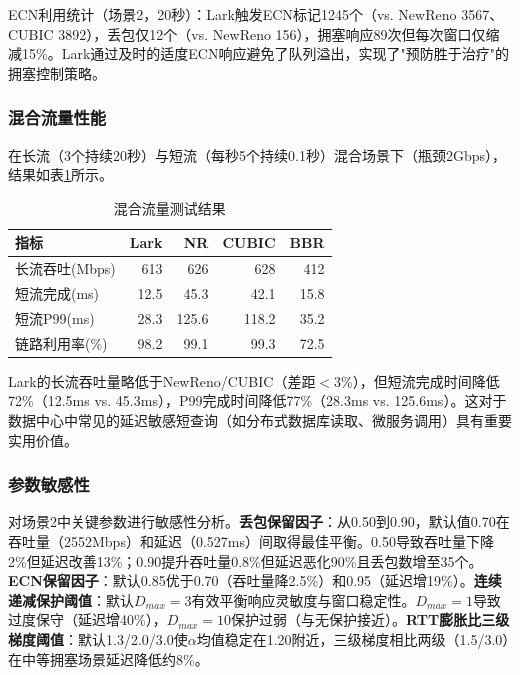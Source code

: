\documentclass[10pt,twocolumn]{article}
\begin{document}
ECN利用统计（场景2，20秒）：Lark触发ECN标记1245个（vs. NewReno 3567、CUBIC 3892），丢包仅12个（vs. NewReno 156），拥塞响应89次但每次窗口仅缩减15\%。Lark通过及时的适度ECN响应避免了队列溢出，实现了"预防胜于治疗"的拥塞控制策略。

\subsubsection{混合流量性能}

在长流（3个持续20秒）与短流（每秒5个持续0.1秒）混合场景下（瓶颈2Gbps），结果如表\ref{tab:mixed}所示。

\begin{table}[htbp]
\centering
\caption{混合流量测试结果}
\label{tab:mixed}
\small
\begin{tabular}{p{2.5cm}rrrr}
\toprule
\textbf{指标} & \textbf{Lark} & \textbf{NR} & \textbf{CUBIC} & \textbf{BBR} \\
\midrule
长流吞吐(Mbps) & 613 & 626 & 628 & 412 \\
短流完成(ms) & 12.5 & 45.3 & 42.1 & 15.8 \\
短流P99(ms) & 28.3 & 125.6 & 118.2 & 35.2 \\
链路利用率(\%) & 98.2 & 99.1 & 99.3 & 72.5 \\
\bottomrule
\end{tabular}
\end{table}

Lark的长流吞吐量略低于NewReno/CUBIC（差距$<$3\%），但短流完成时间降低72\%（12.5ms vs. 45.3ms），P99完成时间降低77\%（28.3ms vs. 125.6ms）。这对于数据中心中常见的延迟敏感短查询（如分布式数据库读取、微服务调用）具有重要实用价值。

\subsubsection{参数敏感性}

对场景2中关键参数进行敏感性分析。\textbf{丢包保留因子}：从0.50到0.90，默认值0.70在吞吐量（2552Mbps）和延迟（0.527ms）间取得最佳平衡。0.50导致吞吐量下降2\%但延迟改善13\%；0.90提升吞吐量0.8\%但延迟恶化90\%且丢包数增至35个。\textbf{ECN保留因子}：默认0.85优于0.70（吞吐量降2.5\%）和0.95（延迟增19\%）。\textbf{连续递减保护阈值}：默认$D_{max}=3$有效平衡响应灵敏度与窗口稳定性。$D_{max}=1$导致过度保守（延迟增40\%），$D_{max}=10$保护过弱（与无保护接近）。\textbf{RTT膨胀比三级梯度阈值}：默认1.3/2.0/3.0使$\alpha$均值稳定在1.20附近，三级梯度相比两级（1.5/3.0）在中等拥塞场景延迟降低约8\%。

\end{document}
